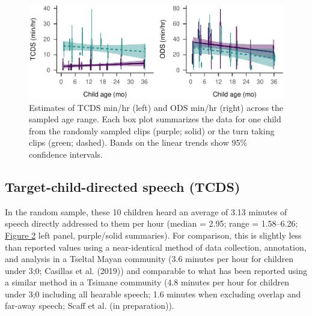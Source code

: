 \documentclass[,man,mask,floatsintext]{apa6}
\begin{document}
\begin{figure}
\centering
\includegraphics{Yeli-CLE_files/figure-latex/fig2-1.pdf}
\caption{\label{fig:fig2}Estimates of TCDS min/hr (left) and ODS min/hr
(right) across the sampled age range. Each box plot summarizes the data
for one child from the randomly sampled clips (purple; solid) or the
turn taking clips (green; dashed). Bands on the linear trends show 95\%
confidence intervals.}
\end{figure}

\subsection{Target-child-directed speech
(TCDS)}\label{target-child-directed-speech-tcds}

In the random sample, these 10 children heard an average of 3.13 minutes
of speech directly addressed to them per hour (median = 2.95; range =
1.58--6.26; \protect\hyperlink{fig2}{Figure 2} left panel, purple/solid
summaries). For comparison, this is slightly less than reported values
using a near-identical method of data collection, annotation, and
analysis in a Tseltal Mayan community (3.6 minutes per hour for children
under 3;0; Casillas et al. (2019)) and comparable to what has been
reported using a similar method in a Tsimane community (4.8 minutes per
hour for children under 3;0 including all hearable speech; 1.6 minutes
when excluding overlap and far-away speech; Scaff et al. (in
preparation)).
\end{document}
